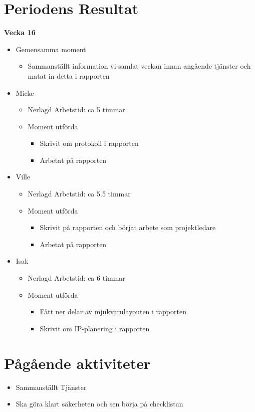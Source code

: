 \section{Periodens Resultat}
\textbf{\LARGE Vecka 16}
\begin{itemize}
\item Gemensamma moment
\begin{itemize}
\item Sammanställt information vi samlat veckan innan angående tjänster och matat in detta i rapporten
\end{itemize}
\item Micke
\begin{itemize}
\item Nerlagd Arbetstid: ca 5 timmar
\item Moment utförda
\begin{itemize}
\item Skrivit om protokoll i rapporten
\item Arbetat på rapporten
\end{itemize}
\end{itemize}

\item Ville
\begin{itemize}
\item Nerlagd Arbetstid: ca 5.5 timmar
\item Moment utförda
\begin{itemize}
\item Skrivit på rapporten och börjat arbete som projektledare
\item Arbetat på rapporten
\end{itemize}
\end{itemize}

\item Isak
\begin{itemize}
\item Nerlagd Arbetstid: ca 6 timmar
\item Moment utförda
\begin{itemize}
\item Fått ner delar av mjukvarulayouten i rapporten
\item Skrivit om IP-planering i rapporten
\end{itemize}
\end{itemize}

\end{itemize}



\section{Pågående aktiviteter}
\begin{itemize}
\item Sammanställt Tjänster
\item Ska göra klart säkerheten och sen börja på checklistan
\end{itemize}
